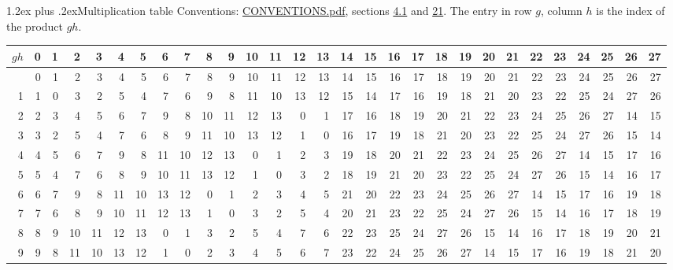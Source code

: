 \documentclass[10pt,a4paper]{article}
\makeatletter
\renewcommand\section{\@startsection{section}{1}{\z@}{-3ex plus -1ex minus -.2ex}%
  {1.2ex plus .2ex}{\normalfont\large\sffamily\bfseries\color{parttitle}}}
\numberwithin{equation}{section}
\makeatother
\begin{document}
\section{Multiplication table}\label{s:multiplication}
Conventions: \href{../../CONVENTIONS.pdf}{CONVENTIONS.pdf}, sections \href{../../../rotation/CONVENTIONS.pdf\#conv.4.1}{4.1} and \href{../../CONVENTIONS.pdf\#conv.21}{21}.
The entry in row $g$, column $h$ is the index of the product $gh$.
{\normalsize\setlength{\tabcolsep}{0.1em}\setlength{\LTleft}{-8pt plus 1fill}\setlength{\LTright}{-8pt plus 1fill}\begin{longtable}{@{}r|rrrrrrrrrrrrrrrrrrrrrrrrrrrr@{}}\toprule
$gh$ & 0 & 1 & 2 & 3 & 4 & 5 & 6 & 7 & 8 & 9 & 10 & 11 & 12 & 13 & 14 & 15 & 16 & 17 & 18 & 19 & 20 & 21 & 22 & 23 & 24 & 25 & 26 & 27\\\midrule\endhead
\bottomrule\endfoot\endlastfoot
0 & 0 & 1 & 2 & 3 & 4 & 5 & 6 & 7 & 8 & 9 & 10 & 11 & 12 & 13 & 14 & 15 & 16 & 17 & 18 & 19 & 20 & 21 & 22 & 23 & 24 & 25 & 26 & 27\\*
1 & 1 & 0 & 3 & 2 & 5 & 4 & 7 & 6 & 9 & 8 & 11 & 10 & 13 & 12 & 15 & 14 & 17 & 16 & 19 & 18 & 21 & 20 & 23 & 22 & 25 & 24 & 27 & 26\\
2 & 2 & 3 & 4 & 5 & 6 & 7 & 9 & 8 & 10 & 11 & 12 & 13 & 0 & 1 & 17 & 16 & 18 & 19 & 20 & 21 & 22 & 23 & 24 & 25 & 26 & 27 & 14 & 15\\
3 & 3 & 2 & 5 & 4 & 7 & 6 & 8 & 9 & 11 & 10 & 13 & 12 & 1 & 0 & 16 & 17 & 19 & 18 & 21 & 20 & 23 & 22 & 25 & 24 & 27 & 26 & 15 & 14\\
4 & 4 & 5 & 6 & 7 & 9 & 8 & 11 & 10 & 12 & 13 & 0 & 1 & 2 & 3 & 19 & 18 & 20 & 21 & 22 & 23 & 24 & 25 & 26 & 27 & 14 & 15 & 17 & 16\\
5 & 5 & 4 & 7 & 6 & 8 & 9 & 10 & 11 & 13 & 12 & 1 & 0 & 3 & 2 & 18 & 19 & 21 & 20 & 23 & 22 & 25 & 24 & 27 & 26 & 15 & 14 & 16 & 17\\
6 & 6 & 7 & 9 & 8 & 11 & 10 & 13 & 12 & 0 & 1 & 2 & 3 & 4 & 5 & 21 & 20 & 22 & 23 & 24 & 25 & 26 & 27 & 14 & 15 & 17 & 16 & 19 & 18\\
7 & 7 & 6 & 8 & 9 & 10 & 11 & 12 & 13 & 1 & 0 & 3 & 2 & 5 & 4 & 20 & 21 & 23 & 22 & 25 & 24 & 27 & 26 & 15 & 14 & 16 & 17 & 18 & 19\\
8 & 8 & 9 & 10 & 11 & 12 & 13 & 0 & 1 & 3 & 2 & 5 & 4 & 7 & 6 & 22 & 23 & 25 & 24 & 27 & 26 & 15 & 14 & 16 & 17 & 18 & 19 & 20 & 21\\
9 & 9 & 8 & 11 & 10 & 13 & 12 & 1 & 0 & 2 & 3 & 4 & 5 & 6 & 7 & 23 & 22 & 24 & 25 & 26 & 27 & 14 & 15 & 17 & 16 & 19 & 18 & 21 & 20\\

\end{longtable}}
\end{document}

